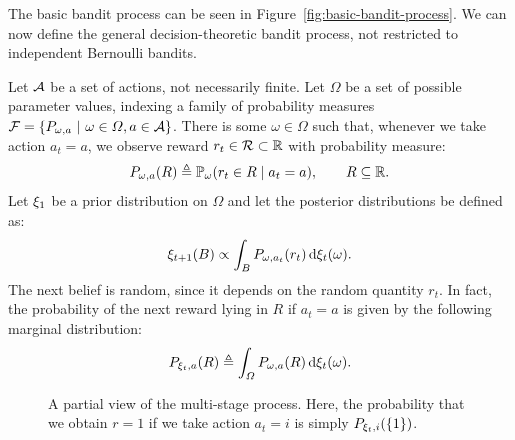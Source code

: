 The basic bandit process can be seen in Figure~\ref{fig:basic-bandit-process}. We can now define the general decision-theoretic bandit process, not restricted to independent Bernoulli bandits.
\begin{definition}
  Let ${\mathcal{A}}$ be a set of actions, not necessarily finite. Let $\Omega$ be a set of possible parameter values, indexing a family of probability measures $\mathcal{F} = \left\{P_{\omega, a} ~\middle|~ \omega \in \Omega, a \in {\mathcal{A}}\right\}$. There is some $\omega \in \Omega$ such that, whenever we take action $a_t = a$, we observe reward $r_t \in {\mathcal{R}} \subset {\mathbb{R}}$ with probability measure:
  \begin{equation}
    \label{eq:bandit-reward-probability}
    P_{\omega,a}(R) \mathrel{\triangleq} \mathop{\mbox{\ensuremath{\mathbb{P}}}}\nolimits_\omega(r_{t} \in R \mid a_t = a),
    \qquad R \subseteq {\mathbb{R}}.
  \end{equation}
  Let $\xi_1$ be a prior distribution on $\Omega$ and let the posterior distributions be defined as:
  \begin{equation}
    \label{eq:bandit-posteriors}
    \xi_{t+1}(B) \propto \int_B P_{\omega, a_t} (r_t) \,\mathrm{d} \xi_t(\omega).
  \end{equation}
  The next belief is random, since it depends on the random quantity $r_t$. In fact, the probability of the next reward lying in $R$ if $a_t = a$ is given by the following marginal distribution:
  \begin{equation}
    \label{eq:dt-bandit-reward-probability}
    P_{\xi_t, a} (R) \mathrel{\triangleq} \int_\Omega P_{\omega,a}(R) \,\mathrm{d}{\xi_t}(\omega).
  \end{equation}
  \begin{figure}[ht]
    \begin{center}
    \end{center}
    \caption{A partial view of the multi-stage process. Here, the probability that we obtain $r=1$ if we take action $a_t = i$ is simply $P_{\xi_t,i}(\{1\})$.}
    \label{fig:multi-stage-bandit}
  \end{figure}  


\end{definition}

